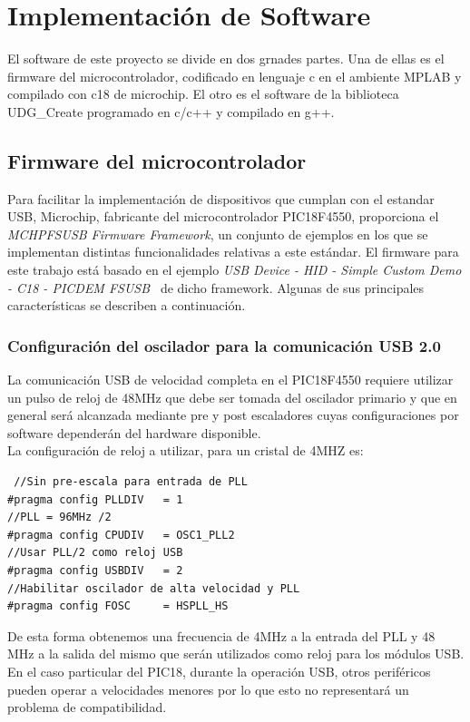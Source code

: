 \documentclass[letterpaper,openright,12pt]{book}
\begin{document}
\chapter{Implementación de Software}
El software de este proyecto se divide en dos grnades partes. Una de ellas es el firmware del microcontrolador, codificado en lenguaje c en el ambiente MPLAB y compilado con c18 de microchip. El otro es el software de la biblioteca UDG\_Create programado en c/c++  y compilado en g++.\\
\section{Firmware del microcontrolador}
Para facilitar la implementación de dispositivos que cumplan con el estandar USB, Microchip, fabricante del microcontrolador PIC18F4550, proporciona el \emph{MCHPFSUSB Firmware Framework}, un conjunto de ejemplos en los que se implementan distintas funcionalidades relativas a este estándar. El firmware para este trabajo está basado en el ejemplo\emph{ USB Device - HID - Simple Custom Demo - C18 - PICDEM FSUSB\ } de dicho framework. Algunas de sus principales características se describen a continuación.\\
\subsection{Configuración del oscilador para la comunicación USB 2.0}
La comunicación USB de velocidad completa en el PIC18F4550 requiere utilizar un pulso de reloj de 48MHz que debe ser tomada del oscilador primario y que en general será alcanzada mediante pre y post escaladores cuyas configuraciones por software dependerán del hardware disponible.\\
La configuración de reloj a utilizar, para un cristal de 4MHZ es:
\begin{lstlisting}
 //Sin pre-escala para entrada de PLL
#pragma config PLLDIV   = 1       
//PLL = 96MHz /2   
#pragma config CPUDIV   = OSC1_PLL2 
//Usar PLL/2 como reloj USB
#pragma config USBDIV   = 2     
//Habilitar oscilador de alta velocidad y PLL    
#pragma config FOSC     = HSPLL_HS  

\end{lstlisting}

De esta forma obtenemos una frecuencia de 4MHz a la entrada del PLL y 48 MHz a la salida del mismo que serán utilizados como reloj para los módulos USB. En el caso particular del PIC18, durante la operación USB, otros periféricos pueden operar a velocidades menores por lo que esto no representará un problema de compatibilidad.\\
\end{document}
